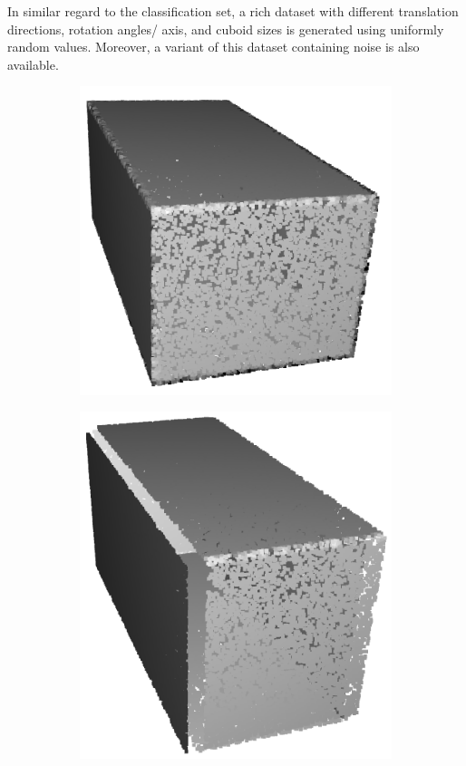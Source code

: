 In similar regard to the classification set, a rich dataset with different translation directions, rotation angles/ axis, and cuboid sizes is generated using uniformly random values. Moreover, a variant of this dataset containing noise is also available.
\begin{figure}[ht]
    \begin{subfigure}{.32\linewidth}
    \centering
    \includegraphics[scale=0.4]{Img/06_room1.png}
    \caption{}
    \label{fig:seg_source}
    \end{subfigure}
    \begin{subfigure}{.32\linewidth}
    \centering
    \includegraphics[scale=0.4]{Img/06_room2.png}

\end{subfigure}
\end{figure}
